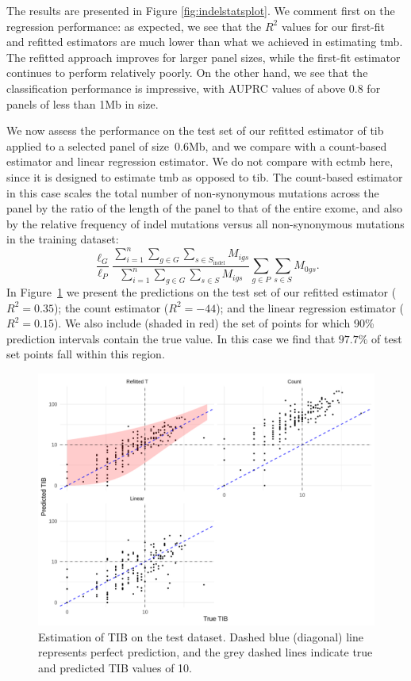 \documentclass[../thesis.tex]{subfiles}
\begin{document}
The results are presented in Figure \ref{fig:indelstatsplot}. We comment first on the regression performance: as expected, we see that the $R^2$ values for our first-fit and refitted estimators are much lower than what we achieved in estimating \gls{tmb}. The refitted approach improves for larger panel sizes, while the first-fit estimator continues to perform relatively poorly. On the other hand, we see that the classification performance is impressive, with AUPRC values of above 0.8 for panels of less than 1Mb in size.

We now assess the performance on the test set of our refitted estimator of \gls{tib} applied to a selected panel of size~0.6Mb, and we compare with a count-based estimator and linear regression estimator. We do not compare with \gls{ectmb} here, since it is designed to estimate \gls{tmb} as opposed to \gls{tib}.  The count-based estimator in this case scales the total number of non-synonymous mutations across the panel by the ratio of the length of the panel to that of the entire exome, and also by the relative frequency of indel mutations versus all non-synonymous mutations in the training dataset:
\[
\frac{\ell_G}{\ell_{P}} \frac{\sum_{i =1}^{n} \sum_{g \in G} \sum_{s \in S_{\text{indel}}} M_{igs}}{\sum_{i=1}^{n}\sum_{g \in G} \sum_{s \in S} M_{igs}}\sum_{g \in P} \sum_{s \in S} M_{0gs}.
\]
In Figure~\ref{fig:indel_predictions_figure} we present the predictions on the test set of our refitted estimator ($R^2 = 0.35$); the count estimator ($R^2 = -44$); and the linear regression estimator ($R^2 = 0.15$). We also include (shaded in red) the set of points for which 90\% prediction intervals contain the true value. In this case we find that $97.7 \%$ of test set points fall within this region.

\begin{figure}[htbp]
\centering
\includegraphics[width=5.5in]{../figures/chapter3/fig10.png}
\vspace*{-5mm}
\caption{Estimation of TIB on the test dataset. Dashed blue (diagonal) line represents perfect prediction, and the grey dashed lines indicate true and predicted TIB values of 10. 
\label{fig:indel_predictions_figure}}
\vspace*{-2mm}
\end{figure} 
\end{document}

